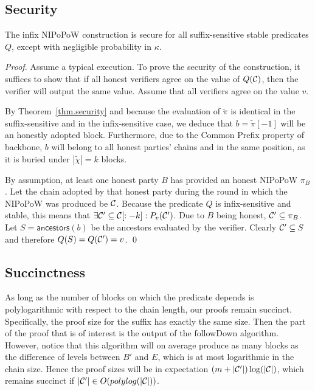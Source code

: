 \subsection{Security}
\begin{theorem}
The infix NIPoPoW construction is secure for all suffix-sensitive stable
predicates $Q$, except with negligible probability in $\kappa$.
\end{theorem}
\begin{proof}
Assume a typical execution. To prove the security of the construction, it
suffices to show that if all honest verifiers agree on the value of $Q(\mathcal{C})$,
then the verifier will output the same value. Assume that all verifiers agree on
the value $v$.

By Theorem~\ref{thm.security} and because the evaluation of $\tilde\pi$ is
identical in the suffix-sensitive and in the infix-sensitive case, we deduce
that $b = \tilde\pi[-1]$ will be an honestly adopted block. Furthermore, due to
the Common Prefix property of backbone, $b$ will belong to all honest parties'
chains and in the same position, as it is buried under $|\tilde\chi| = k$
blocks.

By assumption, at least one honest party $B$ has provided an honest NIPoPoW
$\pi_B$. Let the chain adopted by that honest party during the round in which
the NIPoPoW was produced be $\mathcal{C}$. Because the predicate $Q$ is infix-sensitive
and stable, this means that $\exists \mathcal{C}' \subseteq \mathcal{C}[:-k]:
P_v(\mathcal{C}')$. Due to $B$ being honest, $\mathcal{C}' \subseteq \pi_B$. Let
$S = \textsf{ancestors}(b)$ be the ancestors evaluated by the verifier. Clearly
$\mathcal{C}' \subseteq S$ and therefore $Q(S) = Q(\mathcal{C}') = v$.
\qed
\end{proof}

\subsection{Succinctness}
As long as the number of blocks on which the predicate depends is
polylogarithmic with respect to the chain length, our proofs remain succinct.
Specifically, the proof size for the suffix has exactly the same size. Then
the part of the proof that is of interest is the output of the followDown
algorithm. However, notice that this algorithm will on average produce as many
blocks as the difference of levels between $B'$ and $E$, which is at most
logarithmic in the chain size. Hence the proof sizes will be in expectation
$(m + |\mathcal{C}'|)\log(|\mathcal{C}|)$, which remains succinct if $|\mathcal{C}'| \in
O(polylog(|\mathcal{C}|))$.
